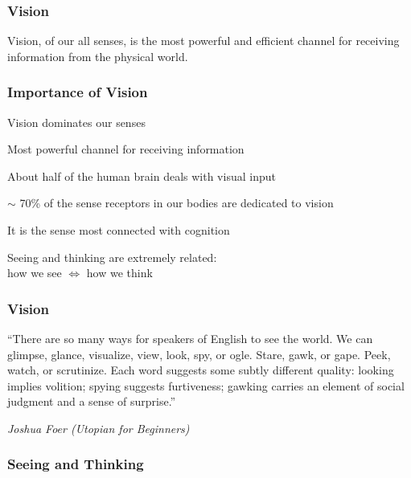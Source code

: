 \documentclass[12pt]{beamer}\usepackage[]{graphicx}\usepackage[]{color}
\begin{document}

\begin{frame}
\frametitle{Vision}

\Large Vision, of our all senses, is the most powerful and efficient 
{\hilit channel for receiving information} from the physical world.

\end{frame}


\begin{frame}
\frametitle{Importance of Vision}

\bbi
  \item Vision dominates our senses
  \item Most powerful channel for receiving information
  \item About half of the human brain deals with visual input
  \item $\sim$ 70\% of the sense receptors in our bodies are dedicated to vision
  \item It is the sense most connected with cognition
  \item Seeing and thinking are extremely related: \\
  how we see $\Leftrightarrow$ how we think
\ei

\end{frame}


\begin{frame}
\frametitle{Vision}

``There are so many ways for speakers of English to see the world. We can glimpse, glance, visualize, view, look, spy, or ogle. Stare, gawk, or gape. Peek, watch, or scrutinize. Each word suggests some subtly different quality: looking implies volition; spying suggests furtiveness; gawking carries an element of social judgment and a sense of surprise.''
\eb

\textit{Joshua Foer (Utopian for Beginners)}

\end{frame}


\begin{frame}
\frametitle{Seeing and Thinking}
\begin{center}
\end{center}
\end{frame}
\end{document}
